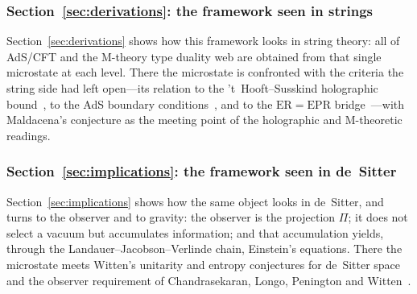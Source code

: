 \subsubsection{Section~\ref{sec:derivations}: the framework seen in strings}
Section~\ref{sec:derivations} shows how this framework looks in string theory: all of AdS/CFT
and the M-theory type duality web are obtained from that single microstate at each level. There
the microstate is confronted with the criteria the string side had left open---its relation to
the 't~Hooft--Susskind holographic bound~\cite{Susskind95}, to the AdS boundary
conditions~\cite{Maldacena98}, and to the $\mathrm{ER}=\mathrm{EPR}$
bridge~\cite{MaldacenaSusskind13}---with Maldacena's conjecture as the meeting point of the
holographic and M-theoretic readings.

\subsubsection{Section~\ref{sec:implications}: the framework seen in de~Sitter}
Section~\ref{sec:implications} shows how the same object looks in de~Sitter, and turns to the
observer and to gravity: the observer is the projection $\Pi$; it does not select a vacuum but
accumulates information; and that accumulation yields, through the
Landauer--Jacobson--Verlinde chain, Einstein's equations. There the microstate meets Witten's
unitarity and entropy conjectures for de~Sitter space~\cite{Witten01dS} and the observer
requirement of Chandrasekaran, Longo, Penington and Witten~\cite{CLPW22}.

